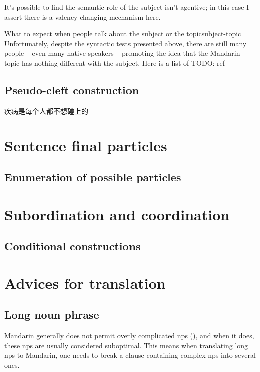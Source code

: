 \documentclass[UTF8, a4paper, oneside, scheme=plain, 12pt]{ctexrep}
\begin{document}
It's possible to find the semantic role of the subject isn't agentive;
in this case I assert there is a valency changing mechanism here.

\begin{infobox}{What to expect when people talk about the subject or the topic}{subject-topic}
    Unfortunately, despite the syntactic tests presented above,
    there are still many people -- even many native speakers -- 
    promoting the idea that the Mandarin topic has nothing different with the subject.
    Here is a list of TODO: ref
\end{infobox}

\section{Pseudo-cleft construction}

\begin{exe}
    \ex 疾病是每个人都不想碰上的
\end{exe}

\chapter{Sentence final particles}

\section{Enumeration of possible particles}\label{sec:sfp.all}

\chapter{Subordination and coordination}

\section{Conditional constructions}



\chapter{Advices for translation}

\section{Long noun phrase}\label{sec:translation.long-noun-phrases}

Mandarin generally does not permit overly complicated \acp{np} (),
and when it does, these \acp{np} are usually considered suboptimal.
This means when translating long \acp{np} to Mandarin,
one needs to break a clause containing complex \acp{np} into several ones.
\end{document}
